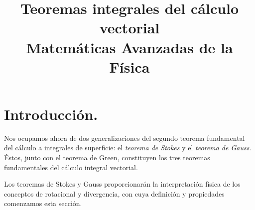 \documentclass[hidelinks,12pt]{article}
\title{Teoremas integrales del cálculo vectorial \\ {\large Matemáticas Avanzadas de la Física}}
\date{ }
\author{}
\renewcommand{\labelenumii}{\arabic{enumi}.\arabic{enumii}}
\begin{document}
\renewcommand\labelenumii{\theenumi.{\arabic{enumii}}}
\maketitle
\fontsize{14}{14}\selectfont
\vspace{-2cm}

\section{Introducción.}
Nos ocupamos ahora de dos generalizaciones del segundo teorema fundamental del cálculo a integrales de superficie: el \emph{teorema de Stokes} y el \emph{teorema de Gauss}. Éstos, junto con el teorema de Green, constituyen los tres teoremas fundamentales del cálculo integral vectorial.
\par
Los teoremas de Stokes y Gauss proporcionarán la interpretación física de los conceptos de rotacional y divergencia, con cuya definición y propiedades comenzamos esta sección.
\end{document}
